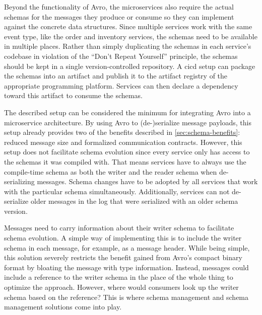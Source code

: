 Beyond the functionality of Avro, the microservices also require the actual schemas for the messages they produce or consume so they can implement against the concrete data structures.
Since multiple services work with the same event type, like the order and inventory services, the schemas need to be available in multiple places.
Rather than simply duplicating the schemas in each service's codebase in violation of the \enquote{Don't Repeat Yourself} principle, the schemas should be kept in a single version-controlled repository.
A \gls{cicd} setup can package the schemas into an artifact and publish it to the artifact registry of the appropriate programming platform.
Services can then declare a dependency toward this artifact to consume the schemas.

The described setup can be considered the minimum for integrating Avro into a microservice architecture.
By using Avro to (de-)serialize message payloads, this setup already provides two of the benefits described in \ref{sec:schema-benefits}: reduced message size and formalized communication contracts.
However, this setup does not facilitate schema evolution since every service only has access to the schemas it was compiled with.
That means services have to always use the compile-time schema as both the writer and the reader schema when de-serializing messages.
Schema changes have to be adopted by all services that work with the particular schema simultaneously.
Additionally, services can not de-serialize older messages in the log that were serialized with an older schema version.

Messages need to carry information about their writer schema to facilitate schema evolution.
A simple way of implementing this is to include the writer schema in each message, for example, as a message header.
While being simple, this solution severely restricts the benefit gained from Avro's compact binary format by bloating the message with type information.
Instead, messages could include a reference to the writer schema in the place of the whole thing to optimize the approach.
However, where would consumers look up the writer schema based on the reference?
This is where schema management and schema management solutions come into play.
